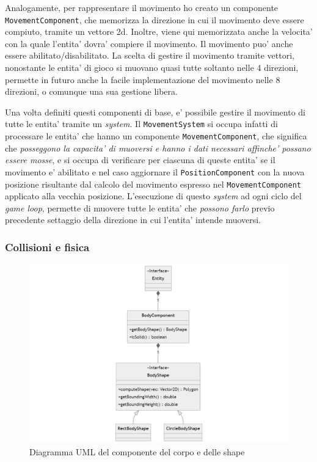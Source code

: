 \documentclass[a4paper,12pt]{report}
\begin{document}
Analogamente, per rappresentare il movimento ho creato un componente \texttt{MovementComponent}, che memorizza la direzione in cui il movimento deve essere compiuto, tramite un vettore 2d. Inoltre, viene qui memorizzata anche la velocita' con la quale l'entita' dovra' compiere il movimento. Il movimento puo' anche essere abilitato/disabilitato. La scelta di gestire il movimento tramite vettori, nonostante le entita' di gioco si muovano quasi tutte soltanto nelle 4 direzioni, permette in futuro anche la facile implementazione del movimento nelle 8 direzioni, o comunque una sua gestione libera.

Una volta definiti questi componenti di base, e' possibile gestire il movimento di tutte le entita' tramite un \textit{system}. Il \texttt{MovementSystem} si occupa infatti di processare le entita' che hanno un componente \texttt{MovementComponent}, che significa che \textit{posseggono la capacita' di muoversi e hanno i dati necessari affinche' possano essere mosse}, e si occupa di verificare per ciascuna di queste entita' se il movimento e' abilitato e nel caso aggiornare il \texttt{PositionComponent} con la nuova posizione risultante dal calcolo del movimento espresso nel \texttt{MovementComponent} applicato alla vecchia posizione. L'esecuzione di questo \textit{system} ad ogni ciclo del \textit{game loop}, permette di muovere tutte le entita' che \textit{possono farlo} previo precedente settaggio della direzione in cui l'entita' intende muoversi.

\subsubsection{Collisioni e fisica}

\begin{figure}[h]
	\centering
	\includegraphics[width=\textwidth]{uml/uml_body.png}
	\caption{Diagramma UML del componente del corpo e delle shape}
\end{figure}
\end{document}
